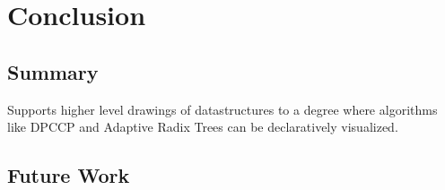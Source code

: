 \section{Conclusion}

\subsection{Summary}

Supports higher level drawings of datastructures to a degree where algorithms like DPCCP and Adaptive Radix Trees can be declaratively visualized.

\subsection{Future Work}
